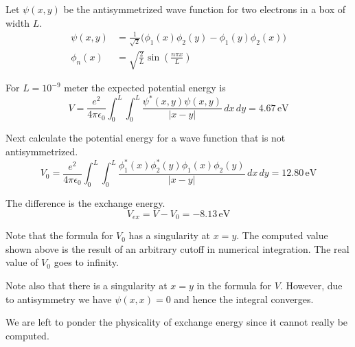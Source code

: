 \documentclass[12pt]{article}
\begin{document}
\noindent
Let $\psi(x,y)$ be the antisymmetrized wave function for two electrons in a box of width $L$.
\begin{align*}
\psi(x,y)&=\frac{1}{\sqrt{2}}
\big(\phi_1(x)\phi_2(y)-\phi_1(y)\phi_2(x)\big)
\\[2ex]
\phi_n(x)&=\sqrt{\frac{2}{L}}\sin\left(\frac{n\pi x}{L}\right)
\end{align*}

\noindent
For $L=10^{-9}$ meter the expected potential energy is
\begin{equation*}
V=\frac{e^2}{4\pi\epsilon_0}\int_0^L\int_0^L\frac{\psi^*(x,y)\psi(x,y)}{|x-y|}\,dx\,dy
=4.67\,\text{eV}
\end{equation*}

\noindent
Next calculate the potential energy for a wave function that is not antisymmetrized.
\begin{equation*}
V_0=\frac{e^2}{4\pi\epsilon_0}
\int_0^L\int_0^L\frac{\phi_1^*(x)\phi_2^*(y)\phi_1(x)\phi_2(y)}{|x-y|}\,dx\,dy
=12.80\,\text{eV}
\end{equation*}

\noindent
The difference is the exchange energy.
\begin{equation*}
V_{ex}=V-V_0=-8.13\,\text{eV}
\end{equation*}

\noindent
Note that the formula for $V_0$ has a singularity at $x=y$.
The computed value shown above is the result of an arbitrary cutoff in numerical integration.
The real value of $V_0$ goes to infinity.

\bigskip
\noindent
Note also that there is a singularity at $x=y$ in the formula for $V$.
However, due to antisymmetry we have $\psi(x,x)=0$ and hence the integral converges.

\bigskip
\noindent
We are left to ponder the physicality of exchange energy since it cannot really be computed.
\end{document}
